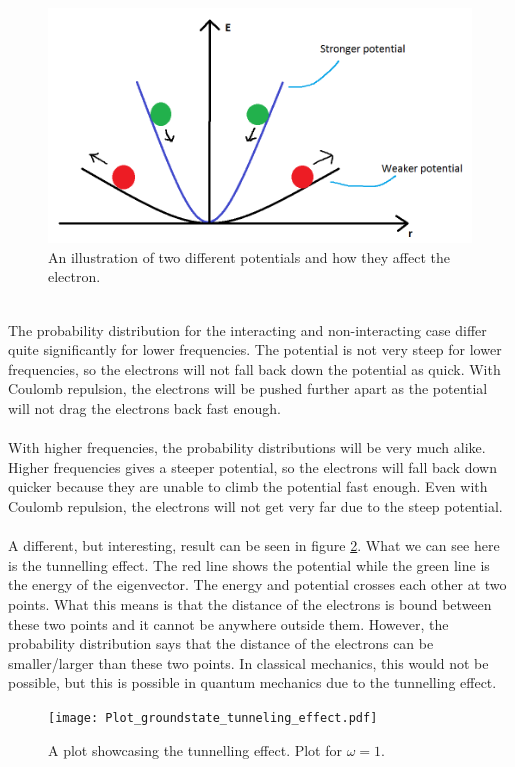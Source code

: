 \documentclass{article}
\begin{document}
\begin{figure}[!h]
	\centering
	\includegraphics[width=\linewidth]{Potential_illustration2.png}
	\caption{An illustration of two different potentials and how they affect the electron.}
	\label{fig:potil}
\end{figure}\\
The probability distribution for the interacting and non-interacting case differ quite significantly for lower frequencies. The potential is not very steep for lower frequencies, so the electrons will not fall back down the potential as quick. With Coulomb repulsion, the electrons will be pushed further apart as the potential will not drag the electrons back fast enough.\\\\
With higher frequencies, the probability distributions will be very much alike. Higher frequencies gives a steeper potential, so the electrons will fall back down quicker because they are unable to climb the potential fast enough. Even with Coulomb repulsion, the electrons will not get very far due to the steep potential.\\\\
A different, but interesting, result can be seen in figure \ref{fig:tun}. What we can see here is the tunnelling effect. The red line shows the potential while the green line is the energy of the eigenvector. The energy and potential crosses each other at two points. What this means is that the distance of the electrons is bound between these two points and it cannot be anywhere outside them. However, the probability distribution says that the distance of the electrons can be smaller/larger than these two points. In classical mechanics, this would not be possible, but this is possible in quantum mechanics due to the tunnelling effect.\\
\begin{figure}[!h]
\centering
\texttt{[image: Plot\_groundstate\_tunneling\_effect.pdf]}
\caption{A plot showcasing the tunnelling effect. Plot for $\omega = 1$.}
	\label{fig:tun}
\end{figure}
\end{document}
